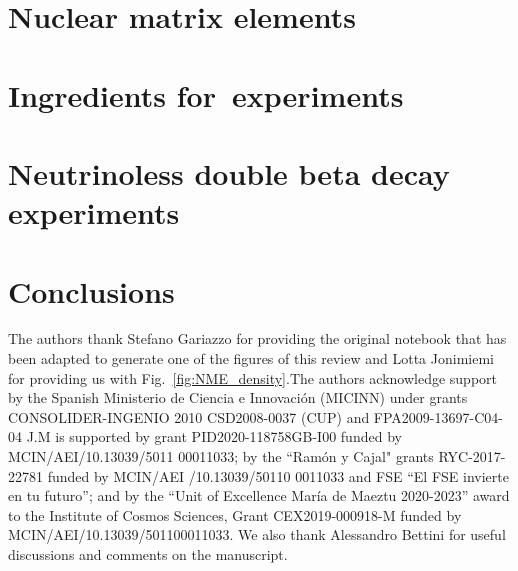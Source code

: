 \documentclass[sn-mathphys]{sn-jnl}%
\begin{document}
\section{Nuclear matrix elements} \label{sec:nme}


\section{Ingredients for\bbonu\ experiments} \label{sec:ingredients}


\section{Neutrinoless double beta decay experiments} \label{sec:experiments}


\section{Conclusions}



\backmatter

The authors thank Stefano Gariazzo for providing the original notebook that has been adapted to generate one of the figures of this review and Lotta Jonimiemi for providing us with Fig.~\ref{fig:NME_density}.The authors acknowledge support by the Spanish Ministerio de Ciencia e Innovaci\'on (MICINN) under grants CONSOLIDER-INGENIO 2010 CSD2008-0037 (CUP) and FPA2009-13697-C04-04
J.M is supported by grant PID2020-118758GB-I00 
funded by MCIN/AEI/10.13039/5011 00011033; 
by the ``Ram\'on y Cajal" grants RYC-2017-22781 funded by MCIN/AEI /10.13039/50110 0011033 and FSE “El FSE invierte en tu futuro”;  
and by the  “Unit of Excellence Mar\'ia de Maeztu 2020-2023” award to the Institute of Cosmos Sciences, Grant CEX2019-000918-M funded by MCIN/AEI/10.13039/501100011033.
We also thank Alessandro Bettini 
for useful discussions and comments on the manuscript.



\end{document}
